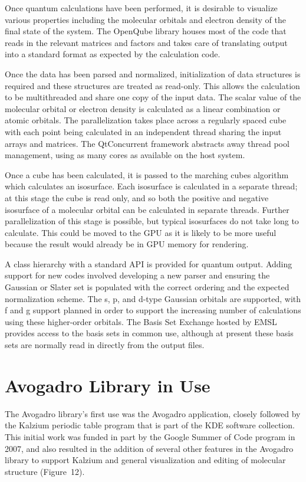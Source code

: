 \documentclass[10pt]{bmc_article}
\newenvironment{bmcformat}{\begin{raggedright}
  \baselineskip20pt\sloppy\setboolean{publ}{false}}{\end{raggedright}
  \baselineskip20pt\sloppy}
\begin{document}
\begin{bmcformat}
Once quantum calculations have been performed, it is desirable
to visualize various properties including the molecular orbitals and electron
density of the final state of the system. The OpenQube library houses most of
the code that reads in the relevant matrices and factors and takes
care of translating output into a
standard format as expected by the calculation code.

Once the data has been parsed and normalized, initialization of data
structures is required and these structures are treated as read-only. This
allows the calculation to be multithreaded and share one copy of the input data.
The scalar value of the molecular orbital or electron density is calculated as a
linear combination or atomic orbitals. The parallelization takes place across a
regularly spaced cube with each point being calculated in an independent thread
sharing the input arrays and matrices. The QtConcurrent framework abstracts away
thread pool management, using as many cores as available on the host system.

Once a cube has been calculated, it is passed to the marching cubes
algorithm which calculates an isosurface. Each isosurface is
calculated in a separate thread; at this stage the cube is read only,
and so both the positive and negative isosurface of a molecular
orbital can be calculated in separate threads. Further parallelization
of this stage is possible, but typical isosurfaces do not take long to
calculate. This could be moved to the GPU as it is likely to be more useful
because the result would already be in GPU memory for rendering.

A class hierarchy with a standard API is provided for quantum output. Adding
support for new codes involved developing a new parser and ensuring the
Gaussian or Slater set is populated with the correct ordering and the expected
normalization scheme. The s, p, and d-type Gaussian orbitals are supported,
with f and g support planned in order to support the increasing number of
calculations using these higher-order orbitals. The Basis Set Exchange hosted
by EMSL provides access to the basis sets in common use, although at present
these basis sets are normally read in directly from the output files.

\section*{Avogadro Library in Use}

The Avogadro library's first use was the Avogadro application, closely
followed by the Kalzium periodic table program that is part of the KDE software
collection. This initial work was funded in part by the Google Summer of Code
program in 2007, and also resulted in the addition of several other features in
the Avogadro library to support Kalzium and general visualization and editing
of molecular structure (Figure~12).


\end{bmcformat}
\end{document}
